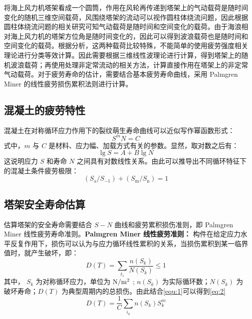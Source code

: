 \documentclass[12pt, a4paper]{ctexart}
\begin{document}
将海上风力机塔架看成一个圆筒，作用在风轮再传递到塔架上的气动载荷是随时间变化的随机三维空间载荷，风围绕塔架的流动可以视作圆柱体绕流问题，因此根据圆柱体绕流问题的相关研究可知气动载荷是随时间和空间变化的载荷。由于海浪相对海上风力机的塔架方位角是随时间变化的，因此可以得到波浪载荷也是随时间和空间变化的载荷。根据分析，这两种载荷比较特殊，不能简单的使用疲劳强度相关理论进行分类等效计算。因此需要根据三维线性波理论进行计算，得到塔架上的随机波浪载荷；再使用处理非定常流动的相关方法，计算直接作用在塔架上的非定常气动载荷。对于疲劳寿命的估计，需要结合基本疲劳寿命曲线，采用 Palmgren Miner 的线性疲劳损伤累积法则进行计算。

\subsection{混凝土的疲劳特性}

混凝土在对称循环应力作用下的裂纹萌生寿命曲线可以近似写作幂函数形式：
\begin{equation}
S^m N = C
\end{equation}
式中，$m$ 与 $ C $ 是材料、应力幅、加载方式有关的参数。显然，取对数之后有：
\begin{equation}
\lg S = A + B \lg N
\end{equation}
这说明应力 $ S $ 和寿命 $ N $ 之间具有对数线性关系。由此可以推导出不同循环特征下的混凝土条件疲劳极限：
\begin{equation}
\left(S_{\mathrm{a}} / S_{-1}\right)+\left(S_{\mathrm{m}} / S_{\mathrm{n}}\right)=1
\end{equation}

\subsection{塔架安全寿命估算}

估算塔架的安全寿命需要结合 $ S-N $ 曲线和疲劳累积损伤准则，即 Palmgren Miner 线性疲劳寿命准则。\textbf{Palmgren Miner 线性疲劳准则： } 构件在给定应力水平反复作用下，损伤可以认为与应力循环线性累积的关系，当损伤累积到某一临界值时，就产生破坏，即： 
\begin{equation}\label{equ:1}
D(T)=\sum_{t_{1}} \frac{n\left(S_{k}\right)}{N\left(S_{k}\right)} \leq 1
\end{equation}
其中， $ S_k $ 为对称循环应力，单位为 $ \textnormal N/\textnormal m^2 $ ; $ n(S_k) $ 为实际循环数；$ N(S_k) $ 为破坏寿命；$ D(T) $ 为典型周期内的总损伤。由此结合\eqref{equ:1}可以得到\eqref{eq:2}
\begin{equation}
D(T)=\frac{1}{C} \sum_{i_{k}} n\left(S_{k}\right) S_{k}^{m} \label{eq:2}
\end{equation}
\end{document}
